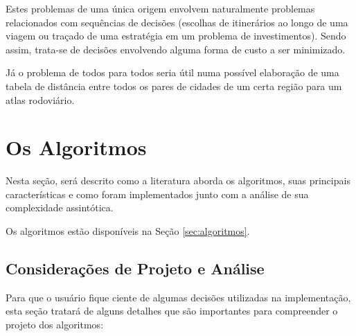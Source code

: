 \documentclass[12pt]{article}
\begin{document}
	Estes problemas de uma única origem envolvem naturalmente problemas relacionados com sequências de decisões (escolhas de itinerários ao longo de uma viagem ou traçado de uma estratégia em um problema de investimentos). Sendo assim, trata-se de decisões envolvendo alguma forma de custo a ser minimizado.
    
    Já o problema de todos para todos seria útil numa possível elaboração de uma tabela de distância entre todos os pares de cidades de um certa região para um atlas rodoviário.



\section{Os Algoritmos}

Nesta seção, será descrito como a literatura aborda os algoritmos, suas principais características e como foram implementados junto com a análise de sua complexidade assintótica.

Os algoritmos estão disponíveis na Seção \ref{sec:algoritmos}.


\subsection{Considerações de Projeto e Análise}

Para que o usuário fique ciente de algumas decisões utilizadas na implementação, esta seção tratará de alguns detalhes que são importantes para compreender o projeto dos algoritmos:
\end{document}
